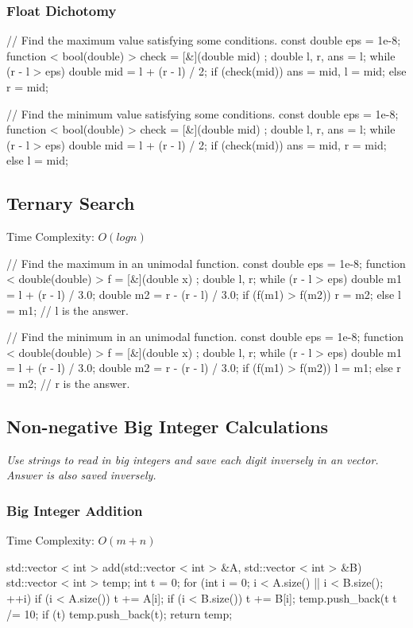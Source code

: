 \subsubsection{Float Dichotomy}
\begin{cppcode}
// Find the maximum value satisfying some conditions.
const double eps = 1e-8;
function < bool(double) > check = [&](double mid) {};
double l, r, ans = l;
while (r - l > eps)
{
    double mid = l + (r - l) / 2;
    if (check(mid)) ans = mid, l = mid;
    else r = mid;
}
\end{cppcode}
\begin{cppcode}
// Find the minimum value satisfying some conditions.
const double eps = 1e-8;
function < bool(double) > check = [&](double mid) {};
double l, r, ans = l;
while (r - l > eps)
{
    double mid = l + (r - l) / 2;
    if (check(mid)) ans = mid, r = mid;
    else l = mid;
}
\end{cppcode}

\subsection{Ternary Search}
Time Complexity: $O(logn)$
\begin{cppcode}
// Find the maximum in an unimodal function.
const double eps = 1e-8;
function < double(double) > f = [&](double x) {};
double l, r;
while (r - l > eps)
{
    double m1 = l + (r - l) / 3.0;
    double m2 = r - (r - l) / 3.0;
    if (f(m1) > f(m2)) r = m2;
    else l = m1; 
}
// l is the answer.
\end{cppcode}
\begin{cppcode}
// Find the minimum in an unimodal function.
const double eps = 1e-8;
function < double(double) > f = [&](double x) {};
double l, r;
while (r - l > eps)
{
    double m1 = l + (r - l) / 3.0;
    double m2 = r - (r - l) / 3.0;
    if (f(m1) > f(m2)) l = m1;
    else r = m2; 
}
// r is the answer.
\end{cppcode}

\subsection{Non-negative Big Integer Calculations}
\emph{Use strings to read in big integers and save each digit inversely in an vector.}
\emph{Answer is also saved inversely.}
\subsubsection{Big Integer Addition}
Time Complexity: $O(m + n)$
\begin{cppcode}
std::vector < int > add(std::vector < int > &A, std::vector < int > &B)
{
    std::vector < int > temp; int t = 0;
    for (int i = 0; i < A.size() || i < B.size(); ++i)
    {
        if (i < A.size()) t += A[i];
        if (i < B.size()) t += B[i];
        temp.push_back(t %
        t /= 10;
    }
    if (t) temp.push_back(t);
    return temp;
}
\end{cppcode}
